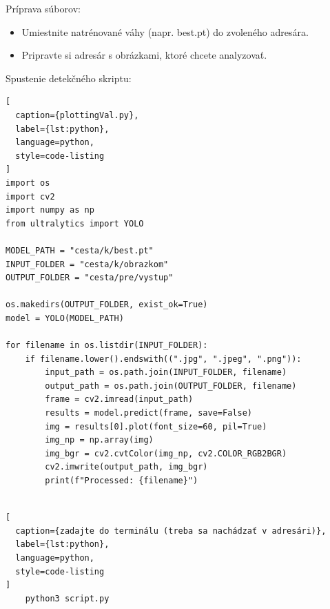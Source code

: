 Príprava súborov:
\begin{itemize}
    \item Umiestnite natrénované váhy (napr. best.pt) do zvoleného adresára.
    \item Pripravte si adresár s obrázkami, ktoré chcete analyzovať.
\end{itemize}
Spustenie detekčného skriptu:
\begin{lstlisting}[
  caption={plottingVal.py},
  label={lst:python},
  language=python,
  style=code-listing
]
import os
import cv2
import numpy as np
from ultralytics import YOLO

MODEL_PATH = "cesta/k/best.pt"
INPUT_FOLDER = "cesta/k/obrazkom"
OUTPUT_FOLDER = "cesta/pre/vystup"

os.makedirs(OUTPUT_FOLDER, exist_ok=True)
model = YOLO(MODEL_PATH)

for filename in os.listdir(INPUT_FOLDER):
    if filename.lower().endswith((".jpg", ".jpeg", ".png")):
        input_path = os.path.join(INPUT_FOLDER, filename)
        output_path = os.path.join(OUTPUT_FOLDER, filename)
        frame = cv2.imread(input_path)
        results = model.predict(frame, save=False)
        img = results[0].plot(font_size=60, pil=True)
        img_np = np.array(img)
        img_bgr = cv2.cvtColor(img_np, cv2.COLOR_RGB2BGR)
        cv2.imwrite(output_path, img_bgr)
        print(f"Processed: {filename}")
        
\end{lstlisting}

\begin{lstlisting}[
  caption={zadajte do terminálu (treba sa nachádzať v adresári)},
  label={lst:python},
  language=python,
  style=code-listing
]
    python3 script.py
\end{lstlisting}